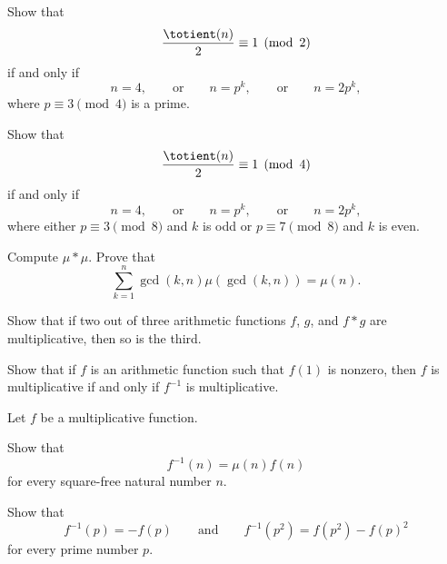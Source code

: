 \begin{routine}
\begin{equation*}
  \end{equation*}
  \exercise 
  \begin{subexenum}
  \item Show that
    \begin{equation*}
      \frac{\totient(n)}{2}\equiv 1\pmod{2}
    \end{equation*}
    if and only if
    \begin{equation*}
      n=4,\qquad\text{or}\qquad n= p^k,\qquad\text{or}\qquad n=2p^k,
    \end{equation*}
    where $p\equiv 3\pmod{4}$ is a prime.
  \item Show that
    \begin{equation*}
      \frac{\totient(n)}{2}\equiv 1\pmod{4}
    \end{equation*}
    if and only if
    \begin{equation*}
      n=4,\qquad\text{or}\qquad n=p^k,\qquad\text{or}\qquad n=2p^k,
    \end{equation*}
    where either $p\equiv 3\pmod{8}$ and $k$ is odd or $p\equiv 7\pmod{8}$ and $k$ is even.
  \end{subexenum}
  \exercise Compute $\mu\ast\mu$.
  \exercise Prove that
  \begin{equation*}
    \sum_{k=1}^n\gcd(k,n)\mu(\gcd(k,n))=\mu(n).
  \end{equation*}
  \exercise
  \begin{subexenum}
  \item Show that if two out of three arithmetic functions $f$, $g$, and $f\ast g$ are multiplicative, then so is the third.
  \item Show that if $f$ is an arithmetic function such that $f(1)$ is nonzero, then $f$ is multiplicative if and only if $f^{-1}$ is multiplicative.
  \end{subexenum}
  \exercise Let $f$ be a multiplicative function.
  \begin{subexenum}
  \item Show that
    \begin{equation*}
      f^{-1}(n)=\mu(n)f(n)
    \end{equation*}
    for every square-free natural number $n$.
  \item Show that
    \begin{equation*}
      f^{-1}(p)=-f(p)\qquad\text{and}\qquad f^{-1}(p^2)=f(p^2)-f(p)^2
    \end{equation*}
    for every prime number $p$.

\end{subexenum}
\end{routine}
